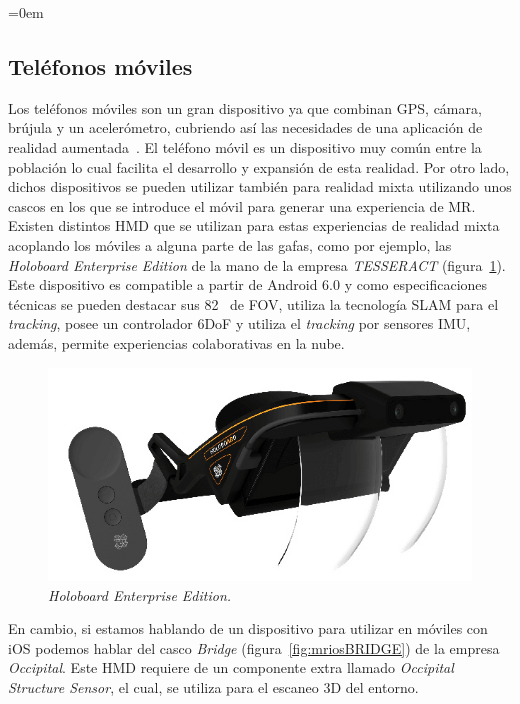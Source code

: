 \parindent=0em
\subsection{Teléfonos móviles}
\label{sec:telefonosMoviles}
\noindent


Los teléfonos móviles son un gran dispositivo ya que combinan GPS, cámara, brújula y un acelerómetro, cubriendo así las necesidades de una aplicación de realidad aumentada~\cite{arsmartphones}. El teléfono móvil es un dispositivo muy común entre la población lo cual facilita el desarrollo y expansión de esta realidad. Por otro lado, dichos dispositivos se pueden utilizar también para realidad mixta utilizando unos cascos en los que se introduce el móvil para generar una experiencia de MR.\\

Existen distintos HMD que se utilizan para estas experiencias de realidad mixta acoplando los móviles a alguna parte de las gafas, como por ejemplo, las \textit{Holoboard Enterprise Edition} de la mano de la empresa \textit{TESSERACT} (figura~\ref{fig:mrandroidTESSERACT}). Este dispositivo es compatible a partir de Android 6.0  y como especificaciones técnicas se pueden destacar sus 82\degree~ de FOV, utiliza la tecnología SLAM para el \textit{tracking}, posee un controlador 6DoF y utiliza el \textit{tracking} por sensores IMU, además, permite experiencias colaborativas en la nube.

\begin{figure}[H]
    \centering
    \includegraphics[scale=0.3]{Images/Estado del arte/mrandroid.jpg}
    \caption[\textit{Holoboard Enterprise Edition}]{
    \textit{Holoboard Enterprise Edition\footnotemark.}
    }
    \label{fig:mrandroidTESSERACT}
\end{figure}
En cambio, si estamos hablando de un dispositivo para utilizar en móviles con iOS podemos hablar del casco \textit{Bridge} (figura~\ref{fig:mriosBRIDGE}) de la empresa \textit{Occipital}. Este HMD requiere de un componente extra llamado \textit{Occipital Structure Sensor}, el cual, se utiliza para el escaneo 3D del entorno.

